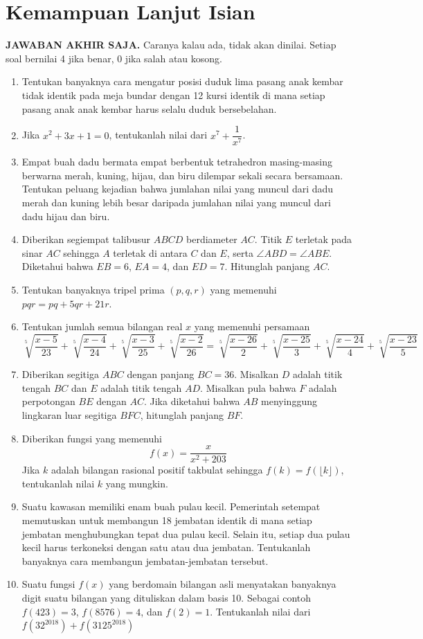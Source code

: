 \documentclass[12pt]{scrartcl}
\begin{document}
\begin{enumerate}
\end{enumerate}

\section{Kemampuan Lanjut Isian}
\textbf{JAWABAN AKHIR SAJA.} Caranya kalau ada, tidak akan dinilai. Setiap soal bernilai 4 jika benar, 0 jika salah atau kosong.
\begin{enumerate}[resume] 
    
    \item Tentukan banyaknya cara mengatur posisi duduk lima pasang anak kembar tidak identik pada meja bundar dengan 12 kursi identik di mana setiap pasang anak anak kembar harus selalu duduk bersebelahan.
    \item Jika $x^2 + 3x + 1 = 0$, tentukanlah nilai dari $x^7+\dfrac{1}{x^7}$.
    \item Empat buah dadu bermata empat berbentuk tetrahedron masing-masing berwarna merah, kuning, hijau, dan biru dilempar sekali secara bersamaan. Tentukan peluang kejadian bahwa jumlahan nilai yang muncul dari dadu merah dan kuning lebih besar daripada jumlahan nilai yang muncul dari dadu hijau dan biru.
    \item Diberikan segiempat talibusur $ABCD$ berdiameter $AC$. Titik $E$ terletak pada sinar $AC$ sehingga $A$ terletak di antara $C$ dan $E$, serta $\angle ABD = \angle ABE$. Diketahui bahwa $EB = 6$, $EA = 4$, dan $ED = 7$. Hitunglah panjang $AC$.
    \item Tentukan banyaknya tripel prima $(p, q, r)$ yang memenuhi $pqr = pq + 5qr + 21r$.
    \item Tentukan jumlah semua bilangan real $x$ yang memenuhi persamaan
        $$\sqrt[5]{\dfrac{x - 5}{23}} + \sqrt[5]{\dfrac{x - 4}{24}} + \sqrt[5]{\dfrac{x - 3}{25}} + \sqrt[5]{\dfrac{x - 2}{26}} = \sqrt[5]{\dfrac{x - 26}{2}} + \sqrt[5]{\dfrac{x - 25}{3}} + \sqrt[5]{\dfrac{x - 24}{4}} + \sqrt[5]{\dfrac{x - 23}{5}}$$
    \item Diberikan segitiga $ABC$ dengan panjang $BC = 36$. Misalkan $D$ adalah titik tengah $BC$ dan $E$ adalah titik tengah $AD$. Misalkan pula bahwa $F$ adalah perpotongan $BE$ dengan $AC$. Jika diketahui bahwa $AB$ menyinggung lingkaran luar segitiga $BFC$, hitunglah panjang $BF$.
    \item Diberikan fungsi yang memenuhi
        $$f(x) = \frac{x}{x^2 + 203}$$
        Jika $k$ adalah bilangan rasional positif takbulat sehingga $f(k) = f(\lfloor k \rfloor)$, tentukanlah nilai $k$ yang mungkin.
    \item Suatu kawasan memiliki enam buah pulau kecil. Pemerintah setempat memutuskan untuk membangun 18 jembatan identik di mana setiap jembatan menghubungkan tepat dua pulau kecil. Selain itu, setiap dua pulau kecil harus terkoneksi dengan satu atau dua jembatan. Tentukanlah banyaknya cara membangun jembatan-jembatan tersebut.
    \item Suatu fungsi $f(x)$ yang berdomain bilangan asli menyatakan banyaknya digit suatu bilangan yang dituliskan dalam basis 10. Sebagai contoh $f(423) = 3$, $f(8576) = 4$, dan $f(2) = 1$. Tentukanlah nilai dari $f(32^{2018}) + f(3125^{2018})$
\end{enumerate}
\end{document}

